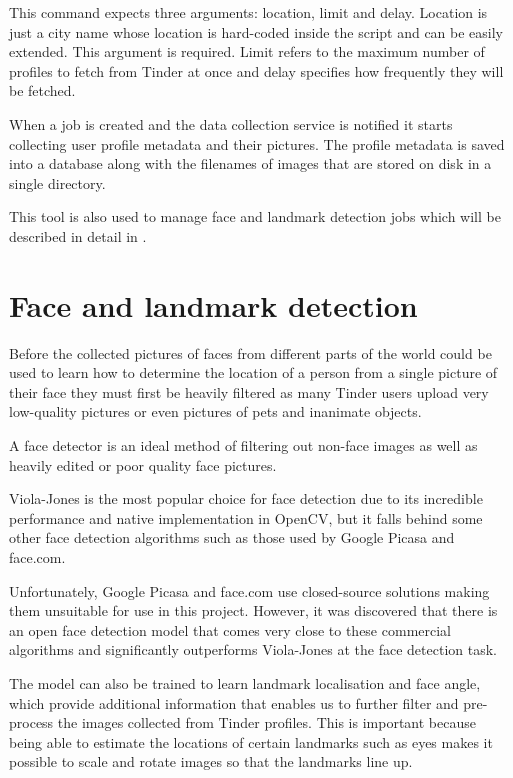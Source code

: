 This command expects three arguments: location, limit and delay. Location is 
just a city name whose location is hard-coded inside the script and can be 
easily extended. This argument is required. Limit refers to the maximum number 
of profiles to fetch from Tinder at once and delay specifies how frequently 
they will be fetched.

When a job is created and the data collection service is notified it starts
collecting user profile metadata and their pictures. The profile metadata is
saved into a database along with the filenames of images that are stored on
disk in a single directory.

This tool is also used to manage face and landmark detection jobs which will 
be described in detail in . 

\section{Face and landmark detection}
\label{spec:fd}
Before the collected pictures of faces from different parts of the world 
could be used to learn how to determine the location of a person from a single 
picture of their face they must first be heavily filtered as many Tinder users 
upload very low-quality pictures or even pictures of pets and inanimate 
objects.

A face detector is an ideal method of filtering out non-face images as well as
heavily edited or poor quality face pictures. 

Viola-Jones is the most popular choice for face detection due to its 
incredible performance and native implementation in OpenCV, but it falls 
behind some other face detection algorithms such as those used by 
Google Picasa and face.com.

Unfortunately, Google Picasa and face.com use closed-source 
solutions making them unsuitable for use in this project. However, it was 
discovered that there is an open face detection model that comes very close 
to these commercial algorithms and significantly outperforms Viola-Jones at
the face detection task.

The model can also be trained to learn landmark localisation and face angle, 
which provide additional information that enables us to further filter and 
pre-process the images collected from Tinder profiles. This is important 
because being able to estimate the locations of certain landmarks such as eyes 
makes it possible to scale and rotate images so that the landmarks line up.

